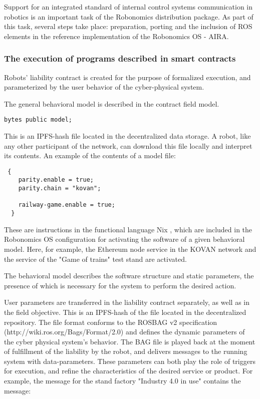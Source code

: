 \documentclass{article}
\begin{document}
Support for an integrated standard of internal control systems communication in robotics is an important task of the Robonomics distribution package. As part of this task, several steps take place: preparation, porting and the inclusion of ROS elements in the reference implementation of the Robonomics OS - AIRA.

\subsubsection{The execution of programs described in smart contracts}

Robots' liability contract is created for the purpose of formalized execution, and parameterized by the user behavior of the cyber-physical system.

The general behavioral model is described in the contract field model.
\begin{lstlisting}
bytes public model;
\end{lstlisting}

This is an IPFS-hash file located in the decentralized data storage. A robot, like any other participant of the network, can download this file locally and interpret its contents. An example of the contents of a model file:

\begin{lstlisting}
 {
    parity.enable = true;
    parity.chain = "kovan";

    railway-game.enable = true;
  }
\end{lstlisting}

These are instructions in the functional language Nix \cite{Dolstra2010NixOS:Distribution}, which are included in the Robonomics OS configuration for activating the software of a given behavioral model. Here, for example, the Ethereum node service in the KOVAN network and the service of the "Game of trains" test stand are activated.

The behavioral model describes the software structure and static parameters, the presence of which is necessary for the system to perform the desired action.

User parameters are transferred in the liability contract separately, as well as in the field objective. This is an IPFS-hash of the file located in the decentralized repository. The file format conforms to the ROSBAG v2 specification (http://wiki.ros.org/Bags/Format/2.0) and defines the dynamic parameters of the cyber physical system's behavior. The BAG file is played back at the moment of fulfillment of the liability by the robot, and delivers messages to the running system with data-parameters. These parameters can both play the role of triggers for execution, and refine the characteristics of the desired service or product. For example, the message for the stand factory "Industry 4.0 in use" contains the message:
\end{document}
